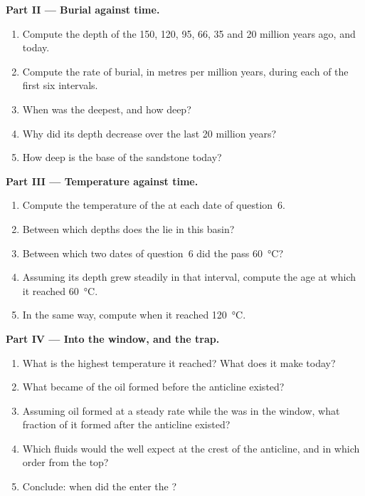 \begin{problem}
\medskip
\noindent\textbf{Part II --- Burial against time.}
\begin{enumerate}[resume]
  \item Compute the depth of the  150, 120, 95, 66, 35 and 20
        million years ago, and today.
  \item Compute the rate of burial, in metres per million years, during
        each of the first six intervals.
  \item When was the  deepest, and how deep?
  \item Why did its depth decrease over the last 20 million years?
  \item How deep is the base of the sandstone today?
\end{enumerate}

\medskip
\noindent\textbf{Part III --- Temperature against time.}
\begin{enumerate}[resume]
  \item Compute the temperature of the  at each date of
        question~6.
  \item Between which depths does the  lie in this basin?
  \item Between which two dates of question~6 did the  pass
        \qty{60}{\degreeCelsius}?
  \item Assuming its depth grew steadily in that interval, compute the age
        at which it reached \qty{60}{\degreeCelsius}.
  \item In the same way, compute when it reached \qty{120}{\degreeCelsius}.
\end{enumerate}

\medskip
\noindent\textbf{Part IV --- Into the window, and the trap.}
\begin{enumerate}[resume]
  \item What is the highest temperature it reached? What does it make
        today?
  \item What became of the oil formed before the anticline existed?
  \item Assuming oil formed at a steady rate while the  was in the
        window, what fraction of it formed after the anticline existed?
  \item Which fluids would the well expect at the crest of the anticline,
        and in which order from the top?
  \item Conclude: when did the  enter the ?
\end{enumerate}
\end{problem}
